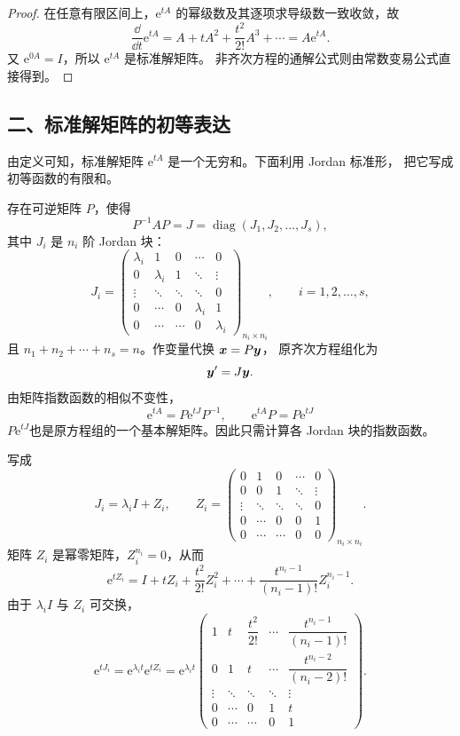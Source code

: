 \begin{proof}
	在任意有限区间上，$\mathrm{e}^{tA}$ 的幂级数及其逐项求导级数一致收敛，故
	\[
		\dfrac{\dd}{\dd t}\mathrm{e}^{tA}
		=A+tA^2+\dfrac{t^2}{2!}A^3+\cdots
		=A\mathrm{e}^{tA}.
	\]
	又 $\mathrm{e}^{0A}=I$，所以 $\mathrm{e}^{tA}$ 是标准解矩阵。
	非齐次方程的通解公式则由常数变易公式直接得到。
\end{proof}

\subsection*{二、标准解矩阵的初等表达}

由定义可知，标准解矩阵 $\mathrm{e}^{tA}$ 是一个无穷和。下面利用 Jordan 标准形，
把它写成初等函数的有限和。

存在可逆矩阵 $P$，使得
\[
	P^{-1}AP
	=J
	=\operatorname{diag}(J_1,J_2,\ldots,J_s),
\]
其中 $J_i$ 是 $n_i$ 阶 Jordan 块：
\[
	J_i=
	\begin{pmatrix}
		\lambda_i&1&0&\cdots&0\\
		0&\lambda_i&1&\ddots&\vdots\\
		\vdots&\ddots&\ddots&\ddots&0\\
		0&\cdots&0&\lambda_i&1\\
		0&\cdots&\cdots&0&\lambda_i
	\end{pmatrix}_{n_i\times n_i},
	\qquad i=1,2,\ldots,s,
\]
且 $n_1+n_2+\cdots+n_s=n$。作变量代换 $\boldsymbol{x}=P\boldsymbol{y}$，
原齐次方程组化为
\[
	\boldsymbol{y}'=J\boldsymbol{y}.
\]
由矩阵指数函数的相似不变性，
\[
	\mathrm{e}^{tA}=P\mathrm{e}^{tJ}P^{-1},
	\qquad
	\mathrm{e}^{tA}P=P\mathrm{e}^{tJ}
\]
$P\mathrm{e}^{tJ}$也是原方程组的一个基本解矩阵。因此只需计算各 Jordan 块的指数函数。

写成
\[
	J_i=\lambda_iI+Z_i,
	\qquad
	Z_i=
	\begin{pmatrix}
		0&1&0&\cdots&0\\
		0&0&1&\ddots&\vdots\\
		\vdots&\ddots&\ddots&\ddots&0\\
		0&\cdots&0&0&1\\
		0&\cdots&\cdots&0&0
	\end{pmatrix}_{n_i\times n_i}.
\]
矩阵 $Z_i$ 是幂零矩阵，$Z_i^{n_i}=0$，从而
\[
	\mathrm{e}^{tZ_i}
	=I+tZ_i+\dfrac{t^2}{2!}Z_i^2+\cdots
	+\dfrac{t^{n_i-1}}{(n_i-1)!}Z_i^{n_i-1}.
\]
由于 $\lambda_iI$ 与 $Z_i$ 可交换，
\[
	\mathrm{e}^{tJ_i}
	=\mathrm{e}^{\lambda_it}\mathrm{e}^{tZ_i}
	=\mathrm{e}^{\lambda_it}
	\begin{pmatrix}
		1&t&\dfrac{t^2}{2!}&\cdots&\dfrac{t^{n_i-1}}{(n_i-1)!}\\
		0&1&t&\cdots&\dfrac{t^{n_i-2}}{(n_i-2)!}\\
		\vdots&\ddots&\ddots&\ddots&\vdots\\
		0&\cdots&0&1&t\\
		0&\cdots&\cdots&0&1
	\end{pmatrix}.
\]

